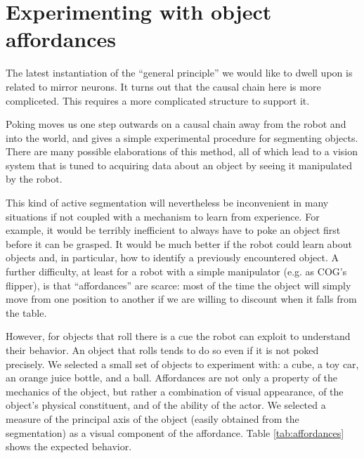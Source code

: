 
\section{Experimenting with object affordances}

\ifverbose
The latest instantiation of the ``general principle'' we would like to
dwell upon is related to mirror neurons. It turns out that the causal
chain here is more compliceted. This requires a more complicated
structure to support it.
\fi

Poking moves us one step outwards on a causal chain away from the
robot and into the world, and gives a simple experimental procedure
for segmenting objects.  There are many possible elaborations of this
method, all of which lead to a vision system that is tuned to 
acquiring data about an object by seeing it manipulated by the robot.  

This kind of active segmentation will nevertheless be inconvenient in many situations if not 
coupled with a mechanism to learn from experience. For example, it 
would be terribly inefficient to always have to poke an object first
before it can be grasped.
It would be much better if the robot could learn about
objects and, in particular, how to identify a previously encountered object. 
A further difficulty, at least for a robot with a simple 
manipulator (e.g. as COG's flipper), is that ``affordances'' are scarce: 
most of the time the object will simply move from one position
to another if we are willing to discount when it falls from the table.

However, for objects that roll there is a cue the robot can exploit
to understand their behavior. An object that rolls tends to do so even 
if it is not poked precisely. We selected a small set of objects to
experiment with: a cube, a toy car, an orange juice bottle, and a ball.
Affordances are not only a property of the mechanics of the object, but 
rather a combination of visual appearance, of the object's physical 
constituent, and of the ability of the actor. We selected a measure of
the principal axis of the object (easily obtained from the segmentation)
as a visual component of the affordance. Table \ref{tab:affordances} 
shows the expected behavior.

